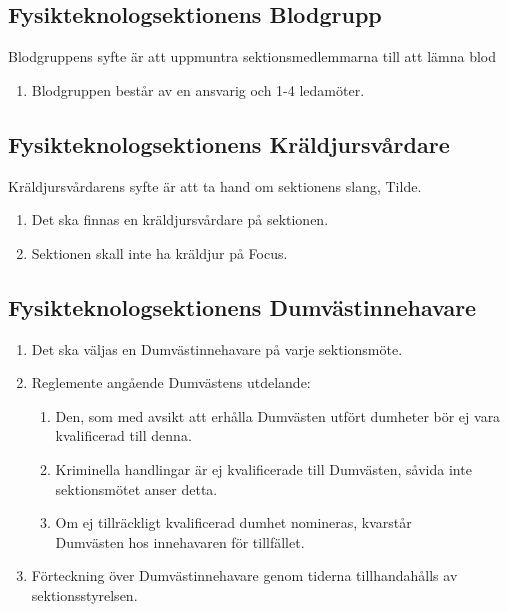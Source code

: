 \documentclass[11pt,a4paper]{article}
\begin{document}
\subsection{Fysikteknologsektionens Blodgrupp}
Blodgruppens syfte är att uppmuntra sektionsmedlemmarna till att lämna blod
\begin{enumerate}[\thesubsection .1]


  \item Blodgruppen består av en ansvarig och 1-4 ledamöter.

\end{enumerate}

\subsection{Fysikteknologsektionens Kräldjursvårdare}
Kräldjursvårdarens syfte är att ta hand om sektionens slang, Tilde.
\begin{enumerate}[\thesubsection .1]

  \item Det ska finnas en kräldjursvårdare på sektionen.

  \item Sektionen skall inte ha kräldjur på Focus.

\end{enumerate}

\subsection{Fysikteknologsektionens Dumvästinnehavare}

\begin{enumerate}[\thesubsection .1]

  \item Det ska väljas en Dumvästinnehavare på varje sektionsmöte.

  \item Reglemente angående Dumvästens utdelande:
    \begin{enumerate}
      \item Den, som med avsikt att erhålla Dumvästen utfört dumheter
      bör ej vara kvalificerad till denna.
      \item Kriminella handlingar är ej kvalificerade till Dumvästen,
      såvida inte sektionsmötet anser detta.
      \item Om ej tillräckligt kvalificerad dumhet nomineras, kvarstår\\
      Dum\-väst\-en hos innehavaren för tillfället.
    \end{enumerate}

  \item Förteckning över Dumvästinnehavare genom tiderna tillhandahålls av sektionsstyrelsen.

\end{enumerate}
\end{document}
